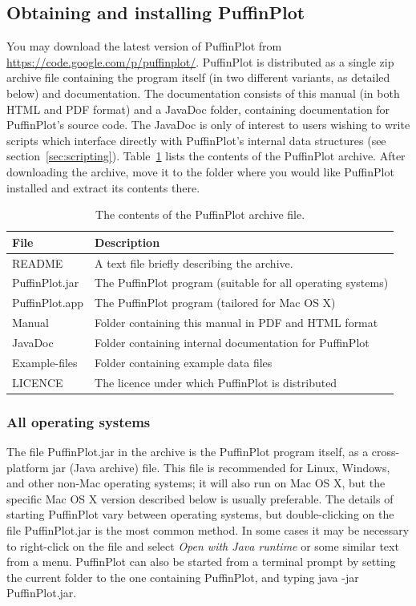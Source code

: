 \documentclass[a4paper,british]{article}
\begin{document}
\subsection{Obtaining and installing PuffinPlot}

You may download the latest version of PuffinPlot from
\url{https://code.google.com/p/puffinplot/}. PuffinPlot is distributed as a
single zip archive file containing the program itself (in two different
variants, as detailed below) and documentation. The documentation consists of
this manual (in both HTML and PDF format) and a JavaDoc folder, containing
documentation for PuffinPlot's source code. The JavaDoc is only of interest
to users wishing to write scripts which interface directly with PuffinPlot's
internal data structures (see section~\ref{sec:scripting}).
Table~\ref{tbl:archive-contents} lists the contents of the PuffinPlot
archive. After downloading the archive, move it to the folder where you
would like PuffinPlot installed and extract its contents there.

\begin{table}[bp]
  \caption{\label{tbl:archive-contents} The contents of the PuffinPlot archive file.}
\begin{tabular}{ll} \toprule
File           & Description \\ \midrule
README         & A text file briefly describing the archive. \\
PuffinPlot.jar & The PuffinPlot program (suitable for all operating systems) \\
PuffinPlot.app & The PuffinPlot program (tailored for Mac OS X) \\
Manual         & Folder containing this manual in PDF and HTML format \\
JavaDoc        & Folder containing internal documentation for PuffinPlot \\
Example-files  & Folder containing example data files \\
LICENCE        & The licence under which PuffinPlot is distributed \\
\bottomrule
\end{tabular}
\end{table}

\subsubsection{All operating systems}

The file \textsf{PuffinPlot.jar} in the archive is the PuffinPlot program
itself, as a cross-platform jar (Java archive) file. This file is recommended
for Linux, Windows, and other non-Mac operating systems; it will also run on
Mac OS X, but the specific Mac OS X version described below is usually
preferable. The details of starting PuffinPlot vary between operating
systems, but double-clicking on the file \textsf{PuffinPlot.jar} is the most
common method. In some cases it may be necessary to right-click on the file
and select \emph{Open with Java runtime} or some similar text from a menu.
PuffinPlot can also be started from a terminal prompt by setting the current
folder to the one containing PuffinPlot, and typing \textsf{java -jar
  PuffinPlot.jar}.
\end{document}
